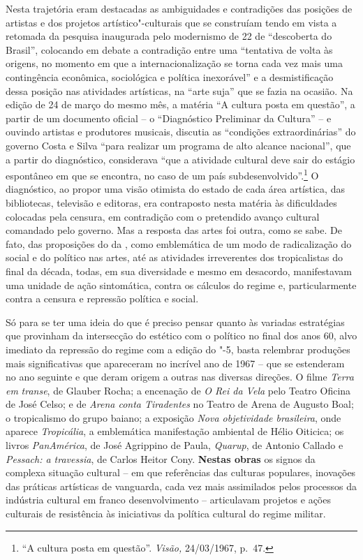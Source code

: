 Nesta trajetória eram destacadas as ambiguidades e contradições das
posições de artistas e dos projetos artístico"-culturais que se
construíam tendo em vista a retomada da pesquisa inaugurada pelo
modernismo de 22 de ``descoberta do Brasil'', colocando em debate a
contradição entre uma ``tentativa de volta às origens, no momento em que
a internacionalização se torna cada vez mais uma contingência econômica,
sociológica e política inexorável'' e a desmistificação dessa posição
nas atividades artísticas, na ``arte suja'' que se fazia na ocasião. Na
edição de 24 de março do mesmo mês, a matéria ``A cultura posta em
questão'', a partir de um documento oficial -- o ``Diagnóstico
Preliminar da Cultura'' -- e ouvindo artistas e produtores musicais,
discutia as ``condições extraordinárias'' do governo Costa e Silva
``para realizar um programa de alto alcance nacional'', que a partir do
diagnóstico, considerava ``que a atividade cultural deve sair do estágio
espontâneo em que se encontra, no caso de um país
subdesenvolvido''.\footnote{``A cultura posta em questão''.
  \emph{Visão,} 24/03/1967, p.~47.} O diagnóstico, ao propor uma visão
otimista do estado de cada área artística, das bibliotecas, televisão e
editoras, era contraposto nesta matéria às dificuldades colocadas pela
censura, em contradição com o pretendido avanço cultural comandado pelo
governo. Mas a resposta das artes foi outra, como se sabe. De fato, das
proposições do  da , como emblemática de um modo de radicalização
do social e do político nas artes, até as atividades irreverentes dos
tropicalistas do final da década, todas, em sua diversidade e mesmo em
desacordo, manifestavam uma unidade de ação sintomática, contra os
cálculos do regime e, particularmente contra a censura e repressão
política e social.

Só para se ter uma ideia do que é preciso pensar quanto às variadas
estratégias que provinham da intersecção do estético com o político no
final dos anos 60, alvo imediato da repressão do regime com a edição do
"-5, basta relembrar produções mais significativas que apareceram no
incrível ano de 1967 -- que se estenderam no ano seguinte e que deram
origem a outras nas diversas direções. O filme \emph{Terra em}
\emph{transe}, de Glauber Rocha; a encenação de \emph{O Rei da Vela}
pelo Teatro Oficina de José Celso; e de \emph{Arena conta Tiradentes} no
Teatro de Arena de Augusto Boal; o tropicalismo do grupo baiano; a
exposição \emph{Nova objetividade brasileira}, onde aparece
\emph{Tropicália}, a emblemática manifestação ambiental de Hélio
Oiticica; os livros \emph{PanAmérica}, de José Agrippino de Paula,
\emph{Quarup}, de Antonio Callado e \emph{Pessach: a travessia}, de
Carlos Heitor Cony. \textbf{Nestas obras} os signos da complexa situação
cultural -- em que referências das culturas populares, inovações das
práticas artísticas de vanguarda, cada vez mais assimilados pelos
processos da indústria cultural em franco desenvolvimento -- articulavam
projetos e ações culturais de resistência às iniciativas da política
cultural do regime militar.

